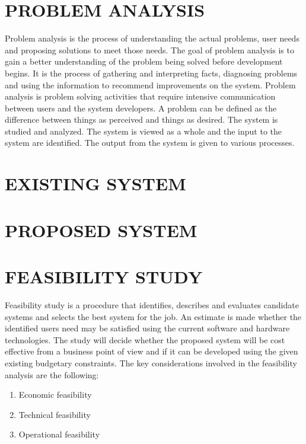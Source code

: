 \documentclass[11pt]{report} %
\begin{document}
\section{PROBLEM ANALYSIS}
\label{sec:PROBLEM ANALYSIS}

Problem analysis is the process of understanding the actual problems, user needs and proposing solutions to meet those needs. The goal of problem analysis is to gain a better understanding of the problem being solved before development begins. It is the process of gathering and interpreting facts, diagnosing problems and using the information to recommend improvements on the system. Problem analysis is problem solving activities that require intensive communication between users and the system developers. A problem can be defined as the difference between things as perceived and things as desired. The system is studied and analyzed. The system is viewed as a whole and the input to the system are identified. The output from the system is given to various processes.


\section{EXISTING SYSTEM}
\label{sec:EXISTING SYSTEM}



\section{PROPOSED SYSTEM}
\label{sec:PROPOSED SYSTEM}


\section{FEASIBILITY STUDY}
\label{sec:FEASIBILITY STUDY}

Feasibility study is a procedure that identifies, describes and evaluates candidate systems and selects the best system for the job. An estimate is made whether the identified users need may be satisfied using the current software and hardware technologies. The study will decide whether the proposed system will be cost effective from a business point of view and if it can be developed using the given existing budgetary constraints. 
The key considerations involved in the feasibility analysis are the following:


\begin{enumerate}
	\item Economic feasibility
	\item Technical feasibility
	\item Operational feasibility
\end{enumerate}
\end{document}
